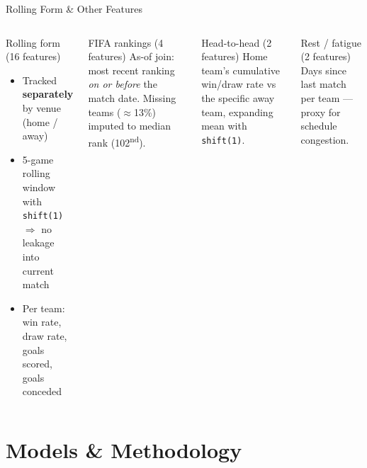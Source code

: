 \documentclass[10pt,aspectratio=169]{beamer}
\begin{document}
\begin{frame}{Rolling Form \& Other Features}
  \begin{columns}[T]
      \begin{block}{Rolling form (16 features)}
        \begin{itemize}
          \item Tracked \textbf{separately} by venue (home / away)
          \item 5-game rolling window with \texttt{shift(1)} \\
                $\Rightarrow$ no leakage into current match
          \item Per team: win rate, draw rate, goals scored, goals conceded
        \end{itemize}
      \end{block}

      \begin{block}{FIFA rankings (4 features)}
        As-of join: most recent ranking \textit{on or before} the match date.
        Missing teams ($\approx$13\%) imputed to median rank (102\textsuperscript{nd}).
      \end{block}
      \smallskip
      \begin{block}{Head-to-head (2 features)}
        Home team's cumulative win/draw rate vs the specific away team,
        expanding mean with \texttt{shift(1)}.
      \end{block}
      \smallskip
      \begin{block}{Rest / fatigue (2 features)}
        Days since last match per team --- proxy for schedule congestion.
      \end{block}
  \end{columns}
\end{frame}

\section{Models \& Methodology}
\end{document}
